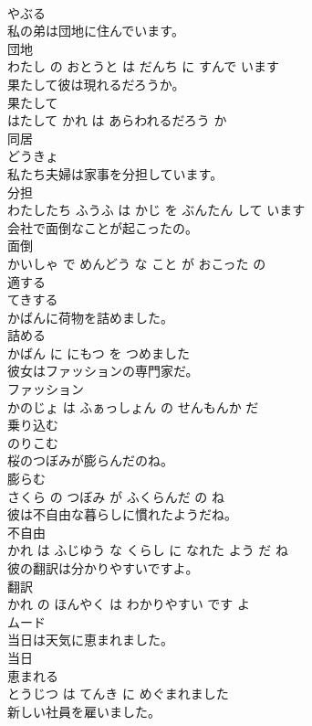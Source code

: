 \documentclass[8pt]{extreport}
\begin{document}
\begin{CJK}{UTF8}{min}
\\	やぶる		
\\	私の弟は団地に住んでいます。	
\\	団地 
\\	わたし の おとうと は だんち に すんで います			
\\	果たして彼は現れるだろうか。	
\\	果たして 
\\	はたして かれ は あらわれるだろう か			
\\	同居	
\\	どうきょ		
\\	私たち夫婦は家事を分担しています。	
\\	分担 
\\	わたしたち ふうふ は かじ を ぶんたん して います			
\\	会社で面倒なことが起こったの。	
\\	面倒 
\\	かいしゃ で めんどう な こと が おこった の			
\\	適する	
\\	てきする		
\\	かばんに荷物を詰めました。	
\\	詰める 
\\	かばん に にもつ を つめました			
\\	彼女はファッションの専門家だ。	
\\	ファッション 
\\	かのじょ は ふぁっしょん の せんもんか だ			
\\	乗り込む	
\\	のりこむ		
\\	桜のつぼみが膨らんだのね。	
\\	膨らむ 
\\	さくら の つぼみ が ふくらんだ の ね			
\\	彼は不自由な暮らしに慣れたようだね。	
\\	不自由 
\\	かれ は ふじゆう な くらし に なれた よう だ ね			
\\	彼の翻訳は分かりやすいですよ。	
\\	翻訳 
\\	かれ の ほんやく は わかりやすい です よ			
\\	ムード	
\\	当日は天気に恵まれました。	
\\	当日 
\\	恵まれる 
\\	とうじつ は てんき に めぐまれました			
\\	新しい社員を雇いました。	

\end{CJK}
\end{document}
